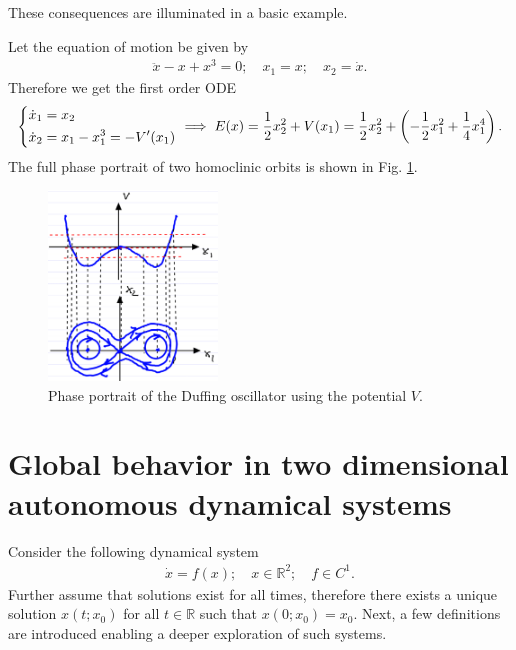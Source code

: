 These consequences are illuminated in a basic example.
\begin{ex}
Let the equation of motion be given by
\begin{align}
\ddot{x}-x+x^3=0;\quad x_1=x;\quad x_2=\dot{x}.	
\end{align}
Therefore we get the first order ODE
\begin{align}
	\begin{dcases}
		\dot{x}_1 = x_2 \\
		\dot{x}_2 = x_1 - x_1^3 = - V'(x_1)
	\end{dcases}
	\implies E(x) = \frac{1}{2}x_2^2+ V(x_1) = \frac{1}{2}x_2^2 + \left( - \frac{1}{2}x_1^2 + \frac{1}{4}x_1^4\right).	
\end{align}
The full phase portrait of two homoclinic orbits is shown in Fig. \ref{fig:duffing_phase_portrait}.
\begin{figure}[h!]
	\centering
	\includegraphics[width=0.4\textwidth]{figures/ch4/5duffing_phase_portrait.png}
	\caption{Phase portrait of the Duffing oscillator using the potential $V$.}
	\label{fig:duffing_phase_portrait}
\end{figure}

\end{ex}

\section{Global behavior in two dimensional autonomous dynamical systems}
Consider the following dynamical system
\begin{align}
	\dot{x} = f(x);\quad x \in \mathbb{R}^{2};\quad f \in C^1.
\end{align}
Further assume that solutions exist for all times, therefore there exists a unique solution $x(t; x_0)$ for all $t \in \mathbb{R}$ such that $x(0;x_0)=x_0$. Next, a few definitions are introduced enabling a deeper exploration of such systems.

